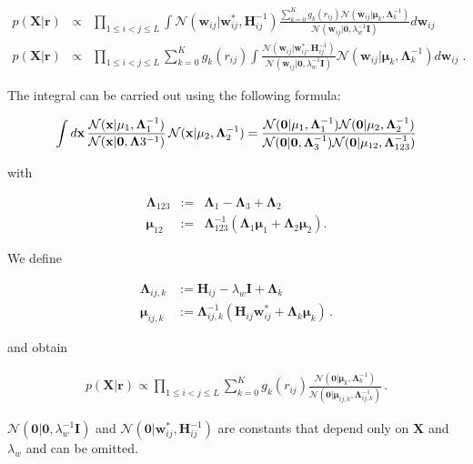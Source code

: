 \documentclass[12pt,a4paper,twoside]{book}
\newcommand{\Gauss}{\mathcal{N}}
\renewcommand{\H}{\mathbf{H}}
\newcommand{\I}{\mathbf{I}}
\newcommand{\Lijk}{\mathbf{\Lambda}_{ij,k}}
\newcommand{\Lk}{\mathbf{\Lambda}_k}
\newcommand{\muijk}{\mathbf{\mu}_{ij,k}}
\newcommand{\muk}{\mathbf{\mu}_k}
\renewcommand{\r}{\mathbf{r}}
\newcommand{\rij}{r_{ij}}
\newcommand{\seq}{\mathbf{x}}
\newcommand{\wij}{\mathbf{w}_{ij}}
\newcommand{\X}{\mathbf{X}}
\theoremstyle{definition}
\theoremstyle{definition}
\theoremstyle{remark}
\begin{document}
\begin{eqnarray}
   p(\X | \r) &\propto& \prod_{1\le i<j\le L} \int \Gauss (\wij | \wij^*, \H_{ij}^{-1}) \frac{\sum_{k=0}^K g_{k}(\rij) \Gauss(\wij | \muk, \Lk^{-1})}{\Gauss (\wij | \mathbf{0}, \lambda_w^{-1} \I)} d \wij \\
   p(\X | \r) &\propto& \prod_{1\le i<j\le L} \sum_{k=0}^K g_{k}(\rij) \int \frac{\Gauss (\wij | \wij^*, \H_{ij}^{-1})}{\Gauss (\wij | \mathbf{0}, \lambda_w^{-1} \I)} \Gauss(\wij | \muk, \Lk^{-1}) d\wij \; .
\label{eq:int-over-w-3}
\end{eqnarray}

The integral can be carried out using the following formula:

\begin{equation}
    \int d\seq \, \frac{ \Gauss( \seq | \mathbf{\mu}_1, \mathbf{\Lambda}_1^{-1}) }{\Gauss(\seq|\mathbf{0},\mathbf{\Lambda}3^{-1})} \, \Gauss(\seq|\mathbf{\mu}_2,\mathbf{\Lambda}_2^{-1}) = \\
    \frac{\Gauss(\mathbf{0}| \mathbf{\mu}_1, \mathbf{\Lambda}_{1}^{-1}) \Gauss(\mathbf{0}| \mathbf{\mu}_2, \mathbf{\Lambda}_{2}^{-1})}{\Gauss(\mathbf{0}|\mathbf{0}, \mathbf{\Lambda}_{3}^{-1}) \Gauss(\mathbf{0}| \mathbf{\mu}_{12}, \mathbf{\Lambda}_{123}^{-1})} 
\end{equation}

with

\begin{eqnarray}
    \mathbf{\Lambda}_{123} &:=& \mathbf{\Lambda}_1 - \mathbf{\Lambda}_3 + \mathbf{\Lambda}_2 \\
    \mathbf{\mu}_{12}  &:=& \mathbf{\Lambda}_{123}^{-1}(\mathbf{\Lambda}_1 \mathbf{\mu}_1 + \mathbf{\Lambda}_2 \mathbf{\mu}_2).
\end{eqnarray}

We define

\begin{align}
    \Lijk   &:= \H_{ij} - \lambda_w \I + \Lk \\ 
    \muijk  &:= \Lijk^{-1}(\H_{ij} \wij^* + \Lk \muk) \,.
\label{eq:def-Jkij}
\end{align}

and obtain

\begin{align}
p(\X | \r) \propto \prod_{1 \le i < j \le L}  \sum_{k=0}^K g_{k}(\rij) \frac{\Gauss( \mathbf{0} | \muk, \Lk^{-1})}{\Gauss(\mathbf{0} | \muijk, \Lijk^{-1})}  \,.
\label{eq:pXr-final}
\end{align}

\(\Gauss( \mathbf{0} | \mathbf{0}, \lambda_w^{-1} \I)\) and
\(\Gauss( \mathbf{0} | \wij^*, \H_{ij}^{-1})\) are constants that depend
only on \(\X\) and \(\lambda_w\) and can be omitted.
\end{document}
